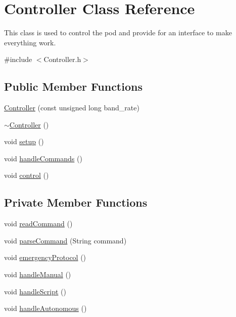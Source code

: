 \hypertarget{class_controller}{}\section{Controller Class Reference}
\label{class_controller}


This class is used to control the pod and provide for an interface to make everything work.  




{\ttfamily \#include $<$Controller.\+h$>$}

\subsection*{Public Member Functions}
\begin{DoxyCompactItemize}
\item 
\hyperlink{class_controller_ae9b318779cd66bba433238054b8c64a4}{Controller} (const unsigned long band\+\_\+rate)
\item 
\hyperlink{class_controller_a0ab87934c4f7a266cfdb86e0f36bc1b5}{$\sim$\+Controller} ()
\item 
void \hyperlink{class_controller_aaff2c0ac01c4d7a6b78718ac8a411c4b}{setup} ()
\item 
void \hyperlink{class_controller_af1fbb94f21eb0601126b14349fa49294}{handle\+Commands} ()
\item 
void \hyperlink{class_controller_a018a5dbae5b2f28fd65a4ebfa1c1ba13}{control} ()
\end{DoxyCompactItemize}
\subsection*{Private Member Functions}
\begin{DoxyCompactItemize}
\item 
void \hyperlink{class_controller_af9cb9dacdc34443221b21ee9d6be7549}{read\+Command} ()
\item 
void \hyperlink{class_controller_aadb7ac5a7709c9d18d7e0bcc67bde5db}{parse\+Command} (String command)
\item 
void \hyperlink{class_controller_a290be619c2e973b2d1c78d50c8125df5}{emergency\+Protocol} ()
\item 
void \hyperlink{class_controller_a28c18ac5bf6ca7f6ea6ac70ad42cb24d}{handle\+Manual} ()
\item 
void \hyperlink{class_controller_a472269f67c81e0300446310b68bbd2d3}{handle\+Script} ()
\item 
void \hyperlink{class_controller_a11dc901b92d8dc082cf9a5e6a0617c4a}{handle\+Autonomous} ()
\end{DoxyCompactItemize}
